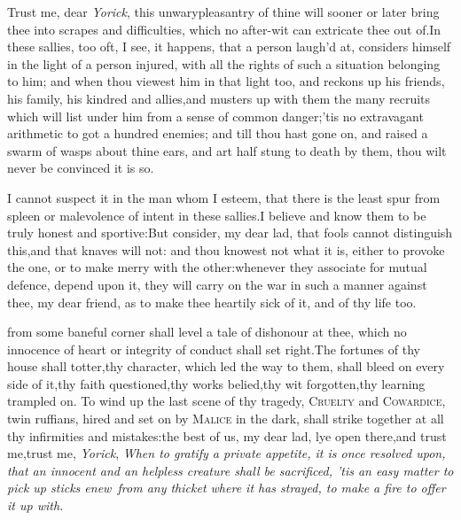 \documentclass{article}
\begin{document}
Trust me, dear \textit{Yorick}, this unwary\break pleasantry of thine
will sooner or later bring thee into scrapes and difficulties,
which no after-wit can extricate thee out of.\tsh  In these
sallies, too oft, I see, it happens, that a person laugh’d at,
considers himself in the light of a person injured, with all the
rights of such a situa\-tion belonging to him; and when thou viewest
him in that light too, and rec\-kons up his friends, his family, his
kindred and allies,\tsk  and musters up with them the many
recruits which will list under him from a sense of common
danger;\tsk  ’tis no extravagant arithmetic to
got a hundred enemies; and till
thou hast gone on, and raised a swarm of wasps about thine ears,
and art half stung to death by them, thou wilt never be
convinced it is so.

I cannot suspect it in the man whom I esteem, that there is the
least spur from spleen or malevolence of intent in these
sallies.\tsk  I believe and know them to be truly honest and
sportive:\tsk  But consider, my dear lad, that fools cannot
distinguish this,\tsk  and that knaves will not: and thou knowest
not what it is, either to provoke the one, or to make merry with
the other:\tsh  whenever they associate for mutual defence,
depend upon it, they will carry on the war in such a manner against
thee, my dear friend, as to make thee heartily sick of it, and of
thy life too.

 from some baneful corner shall level a tale of dishonour at
thee,
which no innocence of heart or integrity of conduct shall set right.\tsh  The
fortunes of thy house shall totter,\tsk  thy character, which led the way to them,
shall bleed on every side of it,\tsk  thy faith questioned,\tsk  thy works
belied,\tsk  thy wit forgotten,\tsk  thy learning trampled on. To wind up the last
scene of thy tragedy, \textsc{Cruelty} and \textsc{Cowardice}, twin ruffians, hired
and set on by \textsc{Malice} in the dark, shall strike together at all thy
infirmities and mistakes:\tsh  the best of us, my dear lad, lye open there,\tsk  and
trust me,\tsk\break  trust me, \textit{Yorick}, \textit{When to gratify a private appetite, it is
once resolved upon, that an innocent and an helpless creature shall be sacrificed,
’tis an easy matter to pick up sticks enew\sic\ from any thicket where it has strayed,
to make a fire to offer it up with.}
\end{document}
